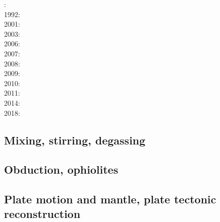 {\scriptsize
{}: \cite{tosl78}\\
1992: \cite{dast92}\\
2001: \cite{bigu01}\cite{haki01}\\
2003: \cite{vank03}\\
2006: \cite{gogc06}\cite{gecy06}\\
2007: \cite{gogc07}\cite{knvk07}\cite{lohd07}\\
2008: \cite{knva08}\cite{cage08}\\
2009: \cite{leki09}\cite{heaa09}\\
2010: \cite{roms10}\cite{hogz10}\\
2011: \cite{zhgh11}\\
2014: \cite{ledg14}\cite{mabv14}\\
2018: \cite{pltv18}
}

\subsection{Mixing, stirring, degassing} 

{\scriptsize
\noindent
\cite{olyb84}
\cite{ketu90}
\cite{pelt96}
\cite{cori99}
\cite{huke01}
\cite{vahb02}
\cite{fasa03}
\cite{colt05}
\cite{gogc07}\cite{nake07}\cite{vabh07}
\cite{lemj11}\cite{saad11}
\cite{onzh18}
}

\subsection{Obduction, ophiolites}
 

{\scriptsize
\noindent
\cite{hack90}
\cite{hack91}
\cite{mokd00}
\cite{agzf14}
\cite{duay16}
}

\subsection{Plate motion and mantle, plate tectonic reconstruction}

